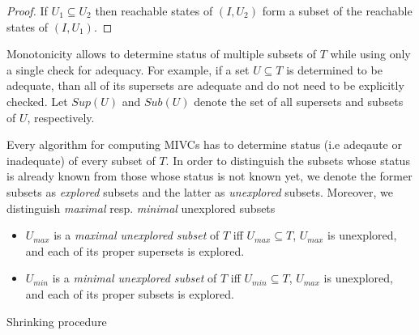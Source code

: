 \begin{proof}
If $U_1 \subseteq U_2$ then reachable states of $(I, U_2)$ form  a subset of the reachable states
of $(I, U_1)$.
\end{proof}
%


Monotonicity allows  to determine status  of multiple subsets of $T$ while using only a single check for adequacy. For example, if a set $U \subseteq T$ is determined to be adequate, than all of its supersets are   adequate and do not need to be explicitly checked. Let     $\mathit{Sup}(U)$ and $\mathit{Sub}(U)$ denote the set of all supersets and subsets of $U$, respectively.

Every algorithm for computing MIVCs has to determine status (i.e adeqaute or inadequate) of every subset of $T$.  In order to distinguish the subsets whose status is already known from those whose status is not known yet, we denote the former subsets as \emph{explored} subsets and the latter as \emph{unexplored} subsets. Moreover, we distinguish \emph{maximal} resp. \emph{minimal} unexplored subsets 
\begin{itemize}
	\item $U_{max}$ is a \emph{maximal unexplored subset} of $T$ iff $U_{max} \subseteq T$, $U_{max}$ is unexplored, and each of its proper supersets is explored.
	\item $U_{min}$ is a \emph{minimal unexplored subset} of $T$ iff $U_{min} \subseteq T$, $U_{max}$ is unexplored, and each of its proper subsets is explored.
\end{itemize}

 

\begin{algorithm}[!t]\label{shrin-procedure}

\caption{Shrinking procedure }
\end{algorithm}


